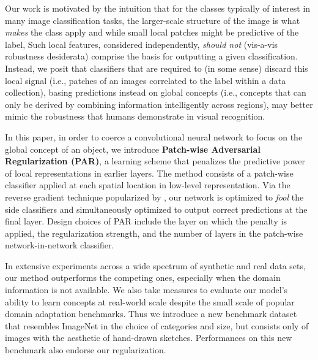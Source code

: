 \documentclass{article}
\begin{document}
Our work is motivated by the intuition 
that for the classes typically of interest in many image classification tasks,
the larger-scale structure of the image is what \emph{makes} the class apply
and while small local patches might be predictive of the label, 
Such local features, considered independently,
\emph{should not} (vis-a-vis robustness desiderata)
comprise the basis for outputting a given classification. 
Instead, we posit that classifiers that are required to 
(in some sense) discard this local signal (i.e., patches of an images correlated to the label within a data collection), 
basing predictions instead on global concepts 
(i.e., concepts that can only be derived by combining information intelligently across regions),
may better mimic the robustness that humans demonstrate in visual recognition.





In this paper, in order to coerce a convolutional neural network 
to focus on the global concept of an object, 
we introduce \textbf{Patch-wise Adversarial Regularization (PAR)},
a learning scheme that penalizes the predictive power
of local representations in earlier layers. 
The method consists of a patch-wise classifier
applied at each 
spatial location in low-level representation.
Via the reverse gradient technique popularized by \citet{ganin2016domain},
our network is optimized to \emph{fool} the side classifiers
and simultaneously optimized to output 
correct predictions at the final layer.
Design choices of PAR include the layer on which the penalty is applied,
the regularization strength, 
and the number of layers in the patch-wise network-in-network classifier.








In extensive experiments 
across a wide spectrum 
of synthetic and real data sets, 
our method outperforms the competing ones, especially when the domain information is not available.
We also take measures to evaluate our model's ability 
to learn concepts at real-world scale
despite the small scale of popular domain adaptation benchmarks.
Thus we introduce a new benchmark dataset 
that resembles ImageNet in the choice of categories and size,
but consists only of images
with the aesthetic of hand-drawn sketches.
Performances on this new benchmark also 
endorse our regularization. 
\end{document}
